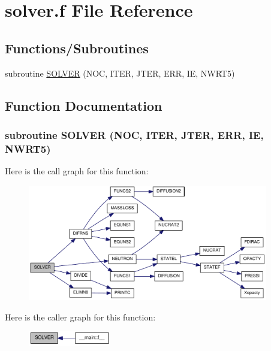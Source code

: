 \hypertarget{solver_8f}{
\section{solver.f File Reference}
\label{solver_8f}
}
\subsection*{Functions/Subroutines}
\begin{DoxyCompactItemize}
\item 
subroutine \hyperlink{solver_8f_a08a1c323e11794598bcdb215243a2055}{SOLVER} (NOC, ITER, JTER, ERR, IE, NWRT5)
\end{DoxyCompactItemize}


\subsection{Function Documentation}
\hypertarget{solver_8f_a08a1c323e11794598bcdb215243a2055}{
\subsubsection[{SOLVER}]{\setlength{\rightskip}{0pt plus 5cm}subroutine SOLVER (NOC, \/  ITER, \/  JTER, \/  ERR, \/  IE, \/  NWRT5)}}
\label{solver_8f_a08a1c323e11794598bcdb215243a2055}


Here is the call graph for this function:\nopagebreak
\begin{figure}[H]
\begin{center}
\leavevmode
\includegraphics[width=297pt]{solver_8f_a08a1c323e11794598bcdb215243a2055_cgraph}
\end{center}
\end{figure}


Here is the caller graph for this function:\nopagebreak
\begin{figure}[H]
\begin{center}
\leavevmode
\includegraphics[width=102pt]{solver_8f_a08a1c323e11794598bcdb215243a2055_icgraph}
\end{center}
\end{figure}
